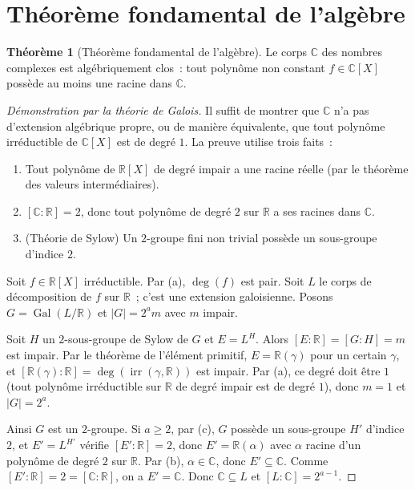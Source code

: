 \documentclass[12pt,a4paper,openany]{book}
\theoremstyle{definition}
\newtheorem{theoreme}{Théorème}[chapter]
\newcommand{\R}{\mathbb{R}}
\newcommand{\C}{\mathbb{C}}
\newcommand{\Gal}{\operatorname{Gal}}
\newcommand{\irr}{\operatorname{irr}}
\renewcommand{\deg}{\operatorname{deg}}
\begin{document}
\section{Théorème fondamental de l'algèbre}\label{sec:TFA}

\begin{theoreme}[Théorème fondamental de l'algèbre]\label{thm:TFA}
Le corps $\C$ des nombres complexes est algébriquement clos~: tout polynôme
non constant $f \in \C[X]$ possède au moins une racine dans $\C$.
\end{theoreme}

\begin{proof}[Démonstration par la théorie de Galois]
Il suffit de montrer que $\C$ n'a pas d'extension algébrique propre, ou de
manière équivalente, que tout polynôme irréductible de $\C[X]$ est de degré $1$.
La preuve utilise trois faits~:
\begin{enumerate}[label=(\alph*)]
  \item Tout polynôme de $\R[X]$ de degré impair a une racine réelle (par
    le théorème des valeurs intermédiaires).
  \item $[\C:\R] = 2$, donc tout polynôme de degré $2$ sur $\R$ a ses
    racines dans $\C$.
  \item (Théorie de Sylow) Un $2$-groupe fini non trivial possède un
    sous-groupe d'indice $2$.
\end{enumerate}

Soit $f \in \R[X]$ irréductible. Par (a), $\deg(f)$ est pair.
Soit $L$ le corps de décomposition de $f$ sur $\R$~; c'est une extension
galoisienne. Posons $G = \Gal(L/\R)$ et $|G| = 2^a m$ avec $m$ impair.

Soit $H$ un $2$-sous-groupe de Sylow de $G$ et $E = L^H$. Alors
$[E:\R] = [G:H] = m$ est impair. Par le théorème de l'élément primitif,
$E = \R(\gamma)$ pour un certain $\gamma$, et
$[\R(\gamma):\R] = \deg(\irr(\gamma,\R))$ est impair. Par (a), ce degré
doit être $1$ (tout polynôme irréductible sur $\R$ de degré impair est de
degré $1$), donc $m = 1$ et $|G| = 2^a$.

Ainsi $G$ est un $2$-groupe. Si $a \geq 2$, par (c), $G$ possède un
sous-groupe $H'$ d'indice $2$, et $E' = L^{H'}$ vérifie $[E':\R] = 2$,
donc $E' = \R(\alpha)$ avec $\alpha$ racine d'un polynôme de degré $2$ sur
$\R$. Par (b), $\alpha \in \C$, donc $E' \subseteq \C$. Comme
$[E':\R] = 2 = [\C:\R]$, on a $E' = \C$. Donc $\C \subseteq L$ et
$[L:\C] = 2^{a-1}$.


\end{proof}
\end{document}
